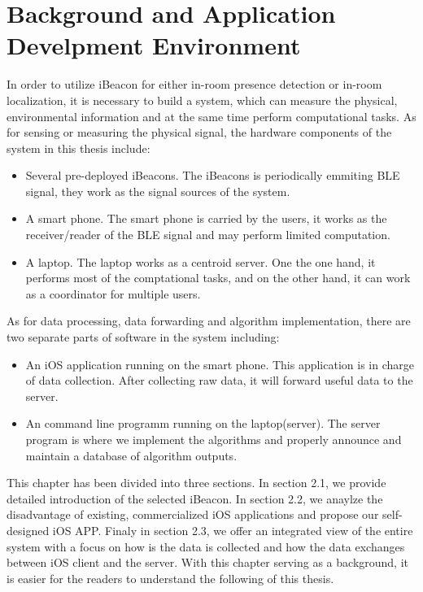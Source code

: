 \documentclass[12pt]{report}
\begin{document}
\chapter{Background and Application Develpment Environment}
In order to utilize iBeacon for either in-room presence detection or in-room localization, it is necessary to build a system, which can measure the physical, environmental information and at the same time perform computational tasks. As for sensing or measuring the physical signal, the hardware components of the system in this thesis include:

\begin{itemize}
\item Several pre-deployed iBeacons. The iBeacons is periodically emmiting BLE signal, they work as the signal sources of the system.
\item A smart phone. The smart phone is carried by the users, it works as the receiver/reader of the BLE signal and may perform limited computation.
\item A laptop. The laptop works as a centroid server. One the one hand, it performs most of the comptational tasks, and on the other hand, it can work as a coordinator for multiple users.
\end{itemize}

As for data processing, data forwarding and algorithm implementation, there are two separate parts of software in the system including:

\begin{itemize}
\item An iOS application running on the smart phone. This application is in charge of data collection. After collecting raw data, it will forward useful data to the server.
\item An command line programm running on the laptop(server). The server program is where we implement the algorithms and properly announce and maintain a database of algorithm outputs.  
\end{itemize}

This chapter has been divided into three sections. In section 2.1, we provide detailed introduction of the selected iBeacon. In section 2.2, we anaylze the disadvantage of existing, commercialized iOS applications and propose our self-designed iOS APP. Finaly in section 2.3, we offer an integrated view of the entire system with a focus on how is the data is collected and how the data exchanges between iOS client and the server. With this chapter serving as a background, it is easier for the readers to understand the following of this thesis.
\end{document}
